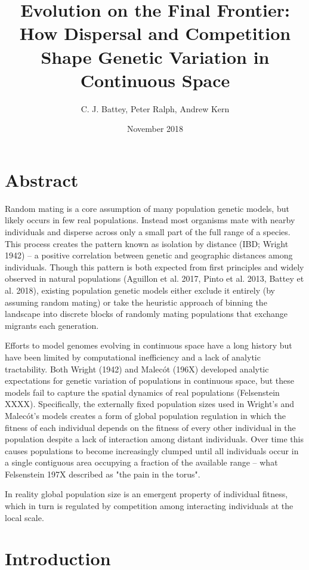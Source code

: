 \documentclass[12pt]{amsart}
\title{ Evolution on the Final Frontier: How Dispersal and Competition Shape Genetic Variation in Continuous Space }
\author{C. J. Battey, Peter Ralph, Andrew Kern}
\date{November 2018} %
\begin{document}
\maketitle
\tableofcontents

\section{Abstract}
Random mating is a core assumption of many population genetic models, but likely occurs in few real populations. Instead most organisms mate with nearby individuals and disperse across only a small part of the full range of a species. This process creates the pattern known as isolation by distance (IBD; Wright 1942) -- a positive correlation between genetic and geographic distances among individuals. Though this pattern is both expected from first principles and widely observed in natural populations (Aguillon et al. 2017, Pinto et al. 2013, Battey et al. 2018), existing population genetic models either exclude it entirely (by assuming random mating) or take the heuristic approach of binning the landscape into discrete blocks of randomly mating populations that exchange migrants each generation. 

Efforts to model genomes evolving in continuous space have a long history but have been limited by computational inefficiency and a lack of analytic tractability. Both Wright (1942) and Malecót (196X) developed analytic expectations for genetic variation of populations in continuous space, but these models fail to capture the spatial dynamics of real populations (Felsenstein XXXX). Specifically, the externally fixed population sizes used in Wright's and Malecót's models creates a form of global population regulation in which the fitness of each individual depends on the fitness of every other individual in the population despite a lack of interaction among distant individuals. Over time this causes populations to become increasingly clumped until all individuals occur in a single contiguous area occupying a fraction of the available range -- what Felsenstein 197X described as "the pain in the torus". 

In reality global population size is an emergent property of individual fitness, which in turn is regulated by competition among interacting individuals at the local scale. 

\section{Introduction}
\end{document}
